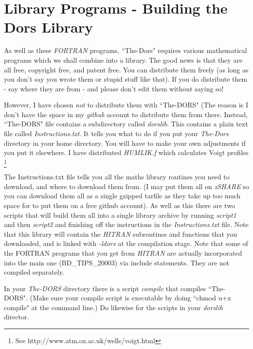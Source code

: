 \documentclass[12pt]{article}
\begin{document}
\section{Library Programs - Building the Dors Library}

As well as these {\it FORTRAN} programs, ``The-Dors" requires various mathematical programs which we shall
 combine into a library. The good news is
that they are all free, copyright free, and patent free. You can distribute them freely (as long as you don't say you wrote
 them or stupid stuff like that). If you do distribute them - say where they are from - and please don't edit them without saying so!  

However, I have chosen {\it not} to distribute
them with ``The-DORS" (The reason is I don't have the space in my {\it github} account to distribute
them from there.  Instead, ``The-DORS" file contains a subdirectory called  {\it dorslib}.
This contains a plain text file called {\it Instructions.txt}. It tells you what to do if you put your {\it The-Dors}
directory in your home directory. You will have to make your own adjustments if you put it elsewhere.
I have distributed {\it HUMLIK.f} \cite{BobWells:MyBib} which calculates Voigt profiles
 \footnote{See http://www.atm.ox.ac.uk/wells/voigt.html}

The Instructions.txt file tells you all the maths library routines you need to download, and where to download them from. 
(I may put them all on {\it zSHARE} so you can download them all as a single gzipped tarfile as they take up
too much space for to put them on a free github account).
As well as this
there are two scripts that will build them all into a single library archive by running {\it script1} and then {\it script2}
and finishing off the instructions in the {\it Instructions.txt} file.
Note that this library will contain the {\it HITRAN} subroutines and functions that you downloaded, and is linked
 with {\it -ldors} at the compilation stage. Note that some of the FORTRAN programs that you get from {\it HITRAN}
are actually incorporated into the main one (BD\_TIPS\_20003) via include statements. They are not compiled separately.

 In your {\it The-DORS} directory there 
is a script {\it compile} that compiles ``The-DORS". (Make sure your compile script is executable by doing ``chmod u+x compile"
at the command line.) Do likewise for the scripts in your {\it dorslib} director.







\end{document}
